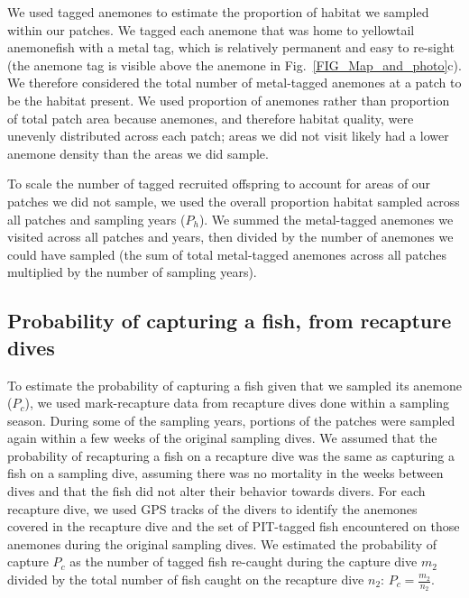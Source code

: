 \documentclass[12pt, oneside]{article}   	%
\begin{document}
We used tagged anemones to estimate the proportion of habitat we sampled within our patches. We tagged each anemone that was home to yellowtail anemonefish with a metal tag, which is relatively permanent and easy to re-sight (the anemone tag is visible above the anemone in Fig.\ \ref{FIG_Map_and_photo}c). We therefore considered the total number of metal-tagged anemones at a patch to be the habitat present. We used proportion of anemones rather than proportion of total patch area because anemones, and therefore habitat quality, were unevenly distributed across each patch; areas we did not visit likely had a lower anemone density than the areas we did sample. %

To scale the number of tagged recruited offspring to account for areas of our patches we did not sample, we used the overall proportion habitat sampled across all patches and sampling years ($P_h$). We summed the metal-tagged anemones we visited across all patches and years, then divided by the number of anemones we could have sampled (the sum of total metal-tagged anemones across all patches multiplied by the number of sampling years).

\subsection{Probability of capturing a fish, from recapture dives} \label{APP_SEC_ProbR}

To estimate the probability of capturing a fish given that we sampled its anemone ($P_c$), we used mark-recapture data from recapture dives done within a sampling season. During some of the sampling years, portions of the patches were sampled again within a few weeks of the original sampling dives. We assumed that the probability of recapturing a fish on a recapture dive was the same as capturing a fish on a sampling dive, assuming there was no mortality in the weeks between dives and that the fish did not alter their behavior towards divers. For each recapture dive, we used GPS tracks of the divers to identify the anemones covered in the recapture dive and the set of PIT-tagged fish encountered on those anemones during the original sampling dives. We estimated the probability of capture $P_c$ as the number of tagged fish re-caught during the capture dive $m_2$ divided by the total number of fish caught on the recapture dive $n_2$: $P_c = \frac{m_2}{n_2}$. %
\end{document}
